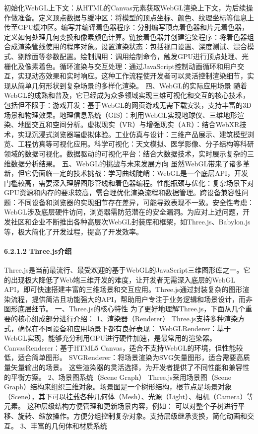 初始化WebGL上下文：从HTML的Canvas元素获取WebGL渲染上下文，为后续操作做准备。定义顶点数据与缓冲区：将模型的顶点坐标、颜色、纹理坐标等信息上传至GPU缓冲区。编写并编译着色器程序：分别编写顶点着色器和片元着色器，定义如何处理几何变换和像素颜色计算。链接着色器并创建渲染程序：将着色器组合成渲染管线使用的程序对象。设置渲染状态：包括视口设置、深度测试、混合模式、剔除面等参数配置。绘制调用：调用绘制命令，触发GPU进行顶点处理、光栅化及像素着色。循环渲染与交互处理：通过JavaScript控制动画循环和用户交互，实现动态效果和实时响应。这种工作流程使开发者可以灵活控制渲染细节，实现从简单几何形状到复杂场景的多样化渲染。 四、WebGL的实际应用场景 随着WebGL的成熟和普及，它已经成为众多领域实现三维可视化和交互的核心技术，包括但不限于：游戏开发：基于WebGL的网页游戏无需下载安装，支持丰富的3D场景和物理效果。地理信息系统（GIS）：利用WebGL实现地球仪、三维地形渲染、地图交互和空间分析。虚拟现实（VR）与增强现实（AR）：结合WebXR技术，实现沉浸式浏览器端虚拟体验。工业仿真与设计：三维产品展示、建筑模型浏览、工程仿真等可视化应用。科学可视化：天文模拟、医学影像、分子结构等科研领域的数据可视化。数据驱动的可视化平台：结合大数据技术，实时展示复杂的三维数据分析结果。 五、WebGL的挑战与未来发展方向 虽然WebGL带来了诸多革新，但它仍面临一定的技术挑战：学习曲线陡峭：WebGL是一个底层API，开发门槛较高，需要深入理解图形管线和着色器编程。性能瓶颈与优化：复杂场景下对GPU资源和内存的要求较高，需合理优化渲染流程和数据管理。跨设备兼容性问题：不同设备和浏览器的实现细节存在差异，可能导致表现不一致。安全性考虑：WebGL涉及底层硬件访问，浏览器需防范潜在的安全漏洞。为应对上述问题，开发社区和企业不断推出各种高层次WebGL封装库和框架，如Three.js、Babylon.js等，极大简化了开发过程，提高了开发效率。 \paragraph{6.2.1.2 Three.js介绍}\label{three.jsux4ecbux7ecd} Three.js是当前最流行、最受欢迎的基于WebGL的JavaScript三维图形库之一。它的出现极大降低了Web端三维开发的难度，让开发者无需深入底层的WebGL API，即可快速搭建丰富的三维场景和交互应用。Three.js通过封装复杂的图形渲染流程，提供简洁且功能强大的API，帮助用户专注于业务逻辑和场景设计，而非图形底层细节。 一、Three.js的核心特性 为了更好地理解Three.js，下面从几个重要的核心组成部分进行介绍： 1、渲染器（Renderer） Three.js支持多种渲染方式，确保在不同设备和应用场景下都有良好表现： WebGLRenderer：基于WebGL实现，能够充分利用GPU进行硬件加速，是最常用的渲染器。 CanvasRenderer：基于HTML5 Canvas，适合不支持WebGL的环境，但性能较低，适合简单图形。 SVGRenderer：将场景渲染为SVG矢量图形，适合需要高质量矢量输出的场景。 这些渲染器的灵活选择，为开发者提供了不同性能和兼容性的平衡方案。 2、场景图系统（Scene Graph） Three.js采用场景图（Scene Graph）结构来组织三维对象。场景图是一个树形结构，根节点是场景对象（Scene），其下可以挂载各种几何体（Mesh）、光源（Light）、相机（Camera）等元素。 这种层级结构方便管理和更新场景内容，例如： 可以对整个子树进行平移、旋转、缩放操作。方便分组控制复杂对象。支持层级继承变换，简化动画和交互。 3、丰富的几何体和材质系统 